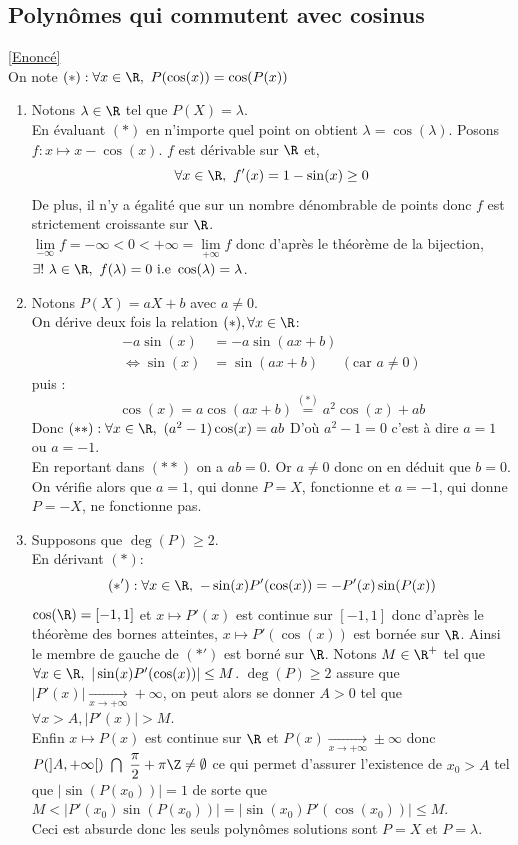 \documentclass{book}
\begin{document}
	\subsection{Polynômes qui commutent avec cosinus }
	\label{sec:polynomes-qui-commutent-avec-cosinus-etoile3}
	\textcolor{blue}{\hyperref[polycommutecos]{[Enoncé]}}\\
	On note $(*):\forall x\in \R,\ P(\cos(x))=\cos(P(x))$
	\begin{enumerate}
		\item Notons $\lambda\in \R$ tel que $P(X)=\lambda$.\\
		En évaluant $(*)$ en n'importe quel point on obtient $\lambda=\cos(\lambda)$.
		Posons $f:x\mapsto x-\cos(x)$. $f$ est dérivable sur $\R$ et,
		$$\forall x\in \R,\ f'(x)=1-\sin(x)\geq 0$$
		De plus, il n'y a égalité que sur un nombre dénombrable de points donc $f$ est strictement croissante sur $\R$.\\
		$\lim\limits_{-\infty}{f}=-\infty<0<+\infty=\lim\limits_{+\infty}{f}$ donc d'après le théorème de la bijection, $\exists!\ \lambda\in \R,\ f(\lambda)=0 \text{ i.e }\cos(\lambda)=\lambda$.
		\item Notons $P(X)=aX+b$ avec $a\ne 0$.\\
		On dérive deux fois la relation $(*),\forall x\in \R$:
		\begin{align*}
			-a\sin(x)&=-a\sin(ax+b)\\
			\iff \sin(x)&=\sin(ax+b)\ \ \ \ \ \ \ (\text{car }a\ne 0)
		\end{align*}
		puis :
		$$\cos(x)=a\cos(ax+b)\overset{(*)}{=}a^2\cos(x)+ab$$
		Donc $(**):\forall x\in \R,\ (a^2-1)\cos(x)=ab$
		D'où $a^2-1=0$ c'est à dire $a=1$ ou $a=-1$.\\
		En reportant dans $(**)$ on a $ab=0$. Or $a\ne 0$ donc on en déduit que $b=0$.\\
		On vérifie alors que $a=1$, qui donne $P=X$, fonctionne et $a=-1$, qui donne $P=-X$, ne fonctionne pas.
		\item Supposons que $\deg(P)\geq 2$.\\
		En dérivant $(*)$:
		$$(*'): \forall x\in \R,\ -\sin(x)P'(\cos(x))=-P'(x)\sin(P(x))$$
		$\cos(\R)=[-1,1]$ et $x\mapsto P'(x)$ est continue sur $[-1,1]$ donc d'après le théorème des bornes atteintes, $x\mapsto P'(\cos(x))$ est bornée sur $\R$. Ainsi le membre de gauche de $(*')$ est borné sur $\R$. Notons $M\in \R^+$ tel que $\forall x\in \R,\ |\sin(x)P'(\cos(x))|\leq M$. $\deg(P)\geq 2$ assure que $|P'(x)|\underset{x\to +\infty}{\longrightarrow}+\infty$, on peut alors se donner $A>0$ tel que $\forall x>A, |P'(x)|>M$.\\
		Enfin $x\mapsto P(x)$ est continue sur $\R$ et $P(x)\underset{x\to +\infty}{\longrightarrow}\pm\infty$ donc $P(]A,+\infty[)\ \bigcap\ \displaystyle\frac{\pi}{2}+ \pi\Z\ne \emptyset$ ce qui permet d'assurer l'existence de $x_0>A$ tel que $|\sin(P(x_0))|=1$ de sorte que $M<|P'(x_0)\sin(P(x_0))|=|\sin(x_0)P'(\cos(x_0))|\leq M$.\\
		Ceci est absurde donc les seuls polynômes solutions sont $P=X$ et $P=\lambda$.
	\end{enumerate}
	
\end{document}
